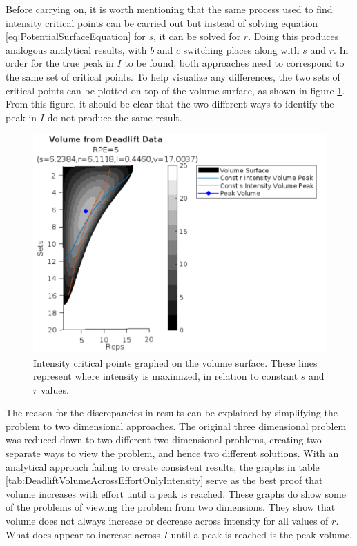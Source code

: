 Before carrying on, it is worth mentioning that the same process used to find intensity critical points can be carried out but instead of solving equation \ref{eq:PotentialSurfaceEquation} for $s$, it can be solved for $r$. Doing this produces analogous analytical results, with $b$ and $c$ switching places along with $s$ and $r$. In order for the true peak in $I$ to be found, both approaches need to correspond to the same set of critical points. To help visualize any differences, the two sets of critical points can be plotted on top of the volume surface, as shown in figure \ref{fig:DeadliftIntensityCriticalPointsOnVolume}. From this figure, it should be clear that the two different ways to identify the peak in $I$ do not produce the same result.

\begin{figure}
    \centering
    \includegraphics[width=140mm]{DeadliftConstants/IntensityCriticalPointsOnVolume.png}
    \caption{Intensity critical points graphed on the volume surface. These lines represent where intensity is maximized, in relation to constant $s$ and $r$ values.}
    \label{fig:DeadliftIntensityCriticalPointsOnVolume}
\end{figure}

The reason for the discrepancies in results can be explained by simplifying the problem to two dimensional approaches. The original three dimensional problem was reduced down to two different two dimensional problems, creating two separate ways to view the problem, and hence two different solutions. With an analytical approach failing to create consistent results, the graphs in table \ref{tab:DeadliftVolumeAcrossEffortOnlyIntensity} serve as the best proof that volume increases with effort until a peak is reached. These graphs do show some of the problems of viewing the problem from two dimensions. They show that volume does not always increase or decrease across intensity for all values of $r$. What does appear to increase across $I$ until a peak is reached is the peak volume.

